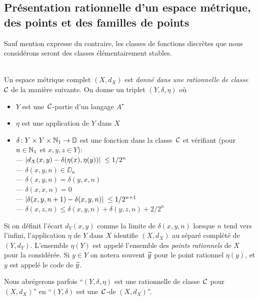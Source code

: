 \subsection[Présentation rationnelle d'un espace métrique, \com des 
points \ldots ]{Présentation rationnelle d'un espace métrique, \com des points 
et des familles de points}\label{fsubsec21}
Sauf mention expresse du contraire, les classes de fonctions discrètes que 
nous considérons seront des classes élémentairement stables.
\begin{fdefinition} \rm \label{f211}
~\\
Un espace métrique complet  $(X, d_X)$  est {\em donné dans une \pres  
rationnelle de classe~${{\cal C}}$} de la manière suivante. On donne un triplet  
$(Y, \delta, \eta)$  où
\begin{itemize}
\item $Y$  est une~${{\cal C}}$-partie d'un langage  $A^{\star}$
\item $\eta$ est une application de $Y$ dans $X$
\item$\delta\colon  Y\times Y\times \mathbb {N}_1\rightarrow
\mathbb {D}$   est une fonction dans la classe~${{\cal C}}$   et vérifiant  (pour  
$n\in\mathbb {N}_1$  et  $x ,  y , z   \in  Y$):\\
--- $\left|{d_X(x,y)-\delta(\eta(x),\eta(y))}\right|\; \leq 1/2^n$\\
--- $\delta(x,y,n) \in \DD_n $\\ 
--- $\delta(x,y,n) = \delta(y,x,n)$\\
--- $\delta(x,x,n) = 0$\\ 
--- $\left|{\delta(x,y,n+1)-\delta(x,y,n)}\right|\;  \leq 1/2^{n+1}$\\ 
--- $\delta(x,z,n) \leq \delta(x,y,n) + \delta(y,z,n) + 2/2^n$ 
\end{itemize}
Si on définit l'écart  $d_Y(x,y)$   comme la limite de $\delta(x,y,n)$ 
lorsque $n$  tend vers l'infini, l'application  $\eta$  de $Y$ dans $X$ 
identifie $(X,d_X)$
au séparé complété de $(Y,d_Y)$.
L'ensemble  $\eta(Y)$  est appelé l'ensemble des {\em points rationnels}  de  
$X$  pour la \pres considérée.  Si  $y \in  Y$  on notera souvent   
$\widetilde{y}$   pour le point rationnel $\eta(y)$,  et  $y$  est appelé le code de  
$\widetilde{y}$.
\end{fdefinition}
Nous abrégerons parfois  ``$(Y,\delta,\eta)$ est une \pres  rationnelle de 
classe~${{\cal C}}$   pour  $(X,d_X)$''  en  ``$(Y,\delta)$ est une~${{\cal C}}$-\pres de  
$(X,d_X)$''.

